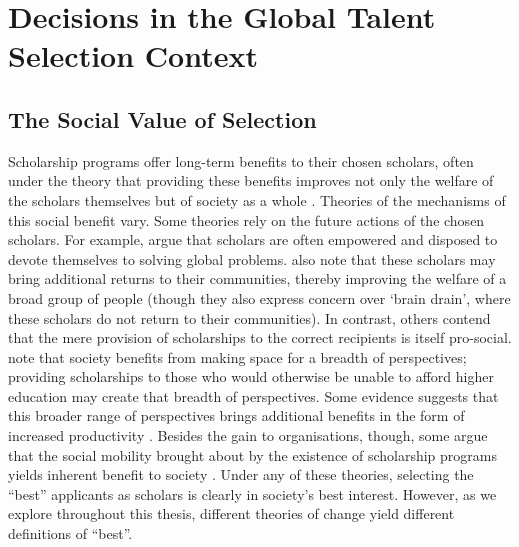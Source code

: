 \chapter{\label{ch:context}Decisions in the Global Talent Selection Context}
\minitoc

\section{The Social Value of Selection}\label{sec:social_value}
Scholarship programs offer long-term benefits to their chosen scholars, often under the theory that providing these benefits improves not only the welfare of the scholars themselves but of society as a whole \cite{DilraboJonbekova_Ruby_2023,Dassin_Marsh_Mawer_2018}. Theories of the mechanisms of this social benefit vary. Some theories rely on the future actions of the chosen scholars. For example, \textcite{Dassin_Marsh_Mawer_2018} argue that scholars are often empowered and disposed to devote themselves to solving global problems. \textcite{Dassin_Marsh_Mawer_2018} also note that these scholars may bring additional returns to their communities, thereby improving the welfare of a broad group of people (though they also express concern over `brain drain', where these scholars do not return to their communities). In contrast, others contend that the mere provision of scholarships to the correct recipients is itself pro-social. \textcite{minkin2023diversity} note that society benefits from making space for a breadth of perspectives; providing scholarships to those who would otherwise be unable to afford higher education may create that breadth of perspectives. Some evidence suggests that this broader range of perspectives brings additional benefits in the form of increased productivity \cite{autor2008does,noray2023systemic}. Besides the gain to organisations, though, some argue that the social mobility brought about by the existence of scholarship programs yields inherent benefit to society \cite{Dassin_Marsh_Mawer_2018}. Under any of these theories, selecting the ``best'' applicants as scholars is clearly in society's best interest. However, as we explore throughout this thesis, different theories of change yield different definitions of ``best''.

